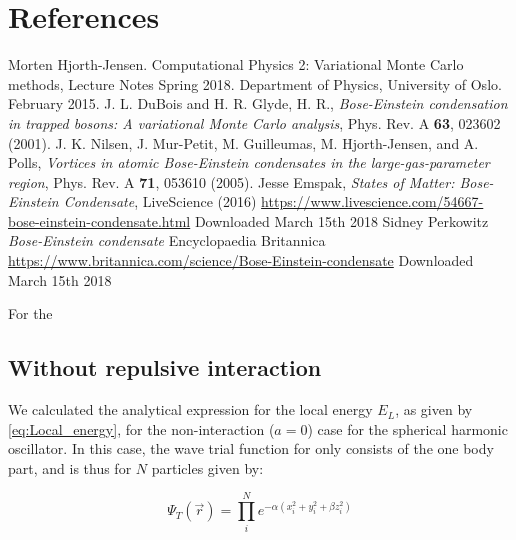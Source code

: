 \documentclass[norsk,a4paper,12pt]{article}
\begin{document}
\section{References}
\begingroup
\renewcommand{\section}[2]{}
\begin{thebibliography}{}
	Morten Hjorth-Jensen.
	Computational Physics 2: Variational Monte Carlo methods, Lecture Notes Spring 2018.
	Department of Physics, University of Oslo.
	February 2015.
	J. L. DuBois and H. R. Glyde, H. R., \emph{Bose-Einstein condensation in trapped bosons: A variational Monte Carlo analysis}, Phys. Rev. A \textbf{63}, 023602 (2001).
	J. K. Nilsen,  J. Mur-Petit, M. Guilleumas, M. Hjorth-Jensen, and A. Polls, \emph{Vortices in atomic Bose-Einstein condensates in the large-gas-parameter region}, Phys. Rev. A \textbf{71}, 053610 (2005).
	Jesse Emspak, \emph{States of Matter: Bose-Einstein Condensate}, LiveScience (2016)
	\url{https://www.livescience.com/54667-bose-einstein-condensate.html}
	Downloaded March 15th 2018
	Sidney Perkowitz \emph{Bose-Einstein condensate} Encyclopaedia Britannica 
	\url{https://www.britannica.com/science/Bose-Einstein-condensate}
	Downloaded March 15th 2018
\end{thebibliography}
\endgroup

\newpage

\section*{Appendix A} \label{appendix_A}

For the 
\subsection{Without repulsive interaction}
We calculated the analytical expression for the local energy $E_L$, as given by \ref{eq:Local_energy}, for the non-interaction ($a=0$) case for the spherical harmonic oscillator. In this case, the wave trial function for only consists of the one body part, and is thus for $N$ particles given by:

\begin{equation}
	\label{eq:WF_nointeract}
	\Psi_T(\vec{r}) = \prod_i^N e^{-\alpha(x_i^2 + y_i^2 + \beta z_i^2)}
\end{equation}
\end{document}
